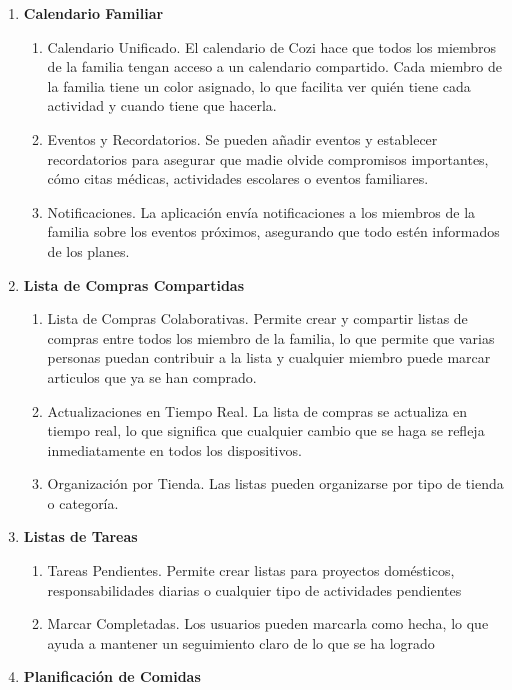 \begin{enumerate}
    \item \textbf{Calendario Familiar}
    \begin{enumerate}
        \item Calendario Unificado. El calendario de Cozi hace que todos los miembros de la familia tengan acceso a un calendario compartido. 
        Cada miembro de la familia tiene un color asignado, lo que facilita ver quién tiene cada actividad y cuando tiene que hacerla.
        \item Eventos y Recordatorios. Se pueden añadir eventos y establecer recordatorios para asegurar que madie olvide compromisos importantes, cómo
        citas médicas, actividades escolares o eventos familiares.
        \item Notificaciones. La aplicación envía notificaciones a los miembros de la familia sobre los eventos próximos, asegurando que todo estén informados de los planes.
    \end{enumerate}
    \item \textbf{Lista de Compras Compartidas}
    \begin{enumerate}
        \item Lista de Compras Colaborativas. Permite crear y compartir listas de compras entre todos los miembro de la familia, 
        lo que permite que varias personas puedan contribuir a la lista y cualquier miembro puede marcar articulos que ya se han comprado. 
        \item Actualizaciones en Tiempo Real. La lista de compras se actualiza en tiempo real, lo que significa que cualquier cambio que se haga se refleja inmediatamente en todos los dispositivos.
        \item Organización por Tienda. Las listas pueden organizarse por tipo de tienda o categoría.
    \end{enumerate}
    \item \textbf{Listas de Tareas}
    \begin{enumerate}
        \item Tareas Pendientes. Permite crear listas para proyectos domésticos, responsabilidades diarias o cualquier tipo de actividades pendientes
        \item Marcar Completadas. Los usuarios pueden marcarla como hecha, lo que ayuda a mantener un seguimiento claro de lo que se ha logrado
    \end{enumerate}
    \item \textbf{Planificación de Comidas}

\end{enumerate}
